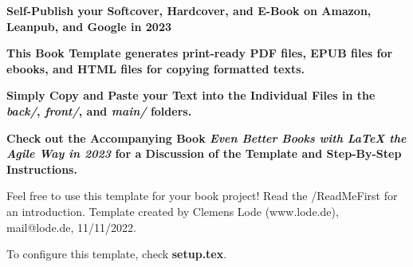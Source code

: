 

\thispagestyle{empty}

\begin{center}

    \bfseries \sffamily \Huge Self-Publish your Softcover, Hardcover, and E-Book on Amazon, Leanpub, and Google in 2023\par
    \bfseries \LARGE This Book Template generates print-ready PDF files, EPUB files for ebooks, and HTML files for copying formatted texts.\par
    \bfseries \LARGE Simply Copy and Paste your Text into the Individual Files in the \textit{back/}, \textit{front/}, and \textit{main/} folders.\par
    \bfseries \LARGE Check out the Accompanying Book \textit{Even Better Books with LaTeX the Agile Way in 2023} for a Discussion of the Template and Step-By-Step Instructions.\par
    \Large Feel free to use this template for your book project! Read the /ReadMeFirst for an introduction. Template created by Clemens Lode (www.lode.de), mail@lode.de, 11/11/2022.\par
    To configure this template, check \textbf{setup.tex}.
    
\end{center}